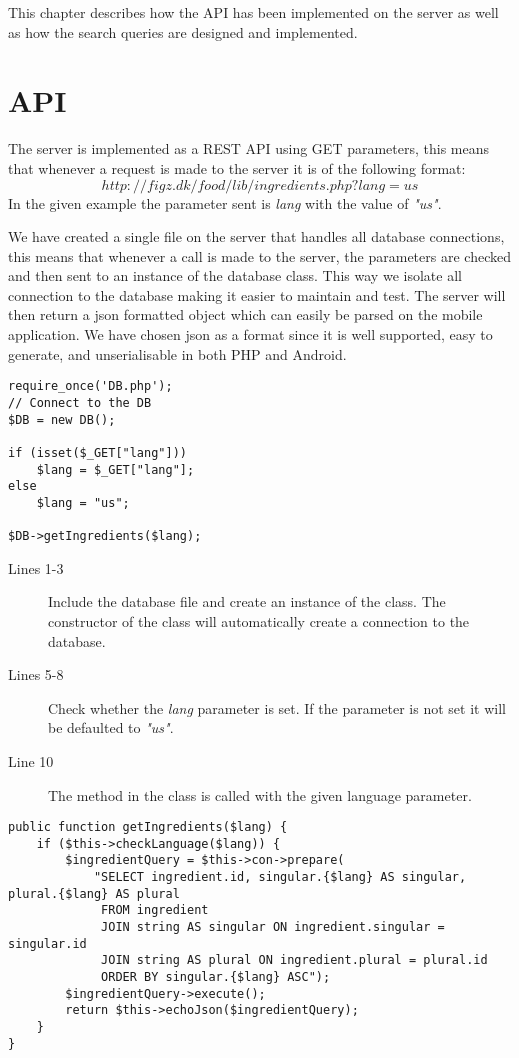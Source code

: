 This chapter describes how the API has been implemented on the server as well as how the search queries are designed and implemented.
\section{API}
\label{sec:com}

The server is implemented as a REST API using GET parameters, this means that whenever a request is made to the server it is of the following format: $$http://figz.dk/food/lib/ingredients.php?lang=us$$ In the given example the parameter sent is \textit{lang} with the value of \textit{"us"}.

We have created a single file on the server that handles all database connections, this means that whenever a call is made to the server, the parameters are checked and then sent to an instance of the database class. This way we isolate all connection to the database making it easier to maintain and test. The server will then return a \ac{json} formatted object which can easily be parsed on the mobile application. We have chosen \ac{json} as a format since it is well supported, easy to generate, and unserialisable in both PHP and Android.

\begin{lstlisting}[language=phpstyle, caption=ingredients.php]
require_once('DB.php');
// Connect to the DB
$DB = new DB();

if (isset($_GET["lang"]))
	$lang = $_GET["lang"];
else
	$lang = "us";

$DB->getIngredients($lang);
\end{lstlisting}%

\begin{description}
\item[Lines 1-3] Include the database file and create an instance of the  class. The constructor of the  class will automatically create a connection to the database.
\item[Lines 5-8] Check whether the \textit{lang} parameter is set. If the parameter is not set it will be defaulted to \textit{"us"}.
\item[Line 10] The method  in the  class is called with the given language parameter.
\end{description}

\begin{lstlisting}[language=phpstyle, label=lst:getIngredients, caption=getIngredients() method of DB class]
public function getIngredients($lang) {
    if ($this->checkLanguage($lang)) {
        $ingredientQuery = $this->con->prepare(
            "SELECT ingredient.id, singular.{$lang} AS singular, plural.{$lang} AS plural
             FROM ingredient
             JOIN string AS singular ON ingredient.singular = singular.id
             JOIN string AS plural ON ingredient.plural = plural.id
             ORDER BY singular.{$lang} ASC");
        $ingredientQuery->execute();
        return $this->echoJson($ingredientQuery);
    }
}
\end{lstlisting}%

